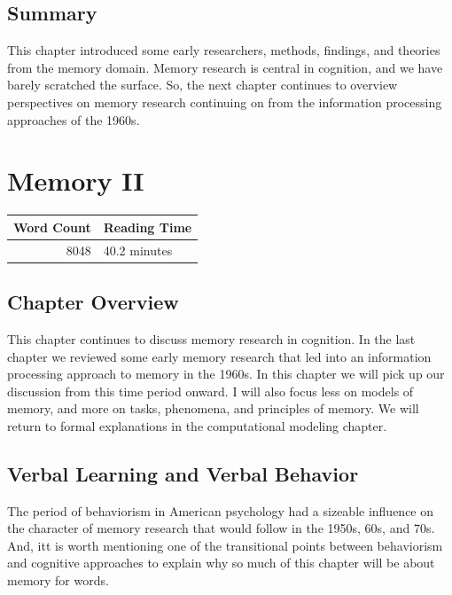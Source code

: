 \documentclass[
  oneside,
  12pt]{crumpbook}
\begin{document}
\hypertarget{summary-2}{%
\section{Summary}\label{summary-2}}

This chapter introduced some early researchers, methods, findings, and theories from the memory domain. Memory research is central in cognition, and we have barely scratched the surface. So, the next chapter continues to overview perspectives on memory research continuing on from the information processing approaches of the 1960s.

\hypertarget{memory-ii}{%
\chapter{Memory II}\label{memory-ii}}

\begin{tabular}{r|l}
\hline
Word Count & Reading Time\\
\hline
8048 & 40.2 minutes\\
\hline
\end{tabular}

\hypertarget{chapter-overview-6}{%
\section{Chapter Overview}\label{chapter-overview-6}}

This chapter continues to discuss memory research in cognition. In the last chapter we reviewed some early memory research that led into an information processing approach to memory in the 1960s. In this chapter we will pick up our discussion from this time period onward. I will also focus less on models of memory, and more on tasks, phenomena, and principles of memory. We will return to formal explanations in the computational modeling chapter.

\hypertarget{verbal-learning-and-verbal-behavior}{%
\section{Verbal Learning and Verbal Behavior}\label{verbal-learning-and-verbal-behavior}}

The period of behaviorism in American psychology had a sizeable influence on the character of memory research that would follow in the 1950s, 60s, and 70s. And, itt is worth mentioning one of the transitional points between behaviorism and cognitive approaches to explain why so much of this chapter will be about memory for words.
\end{document}
